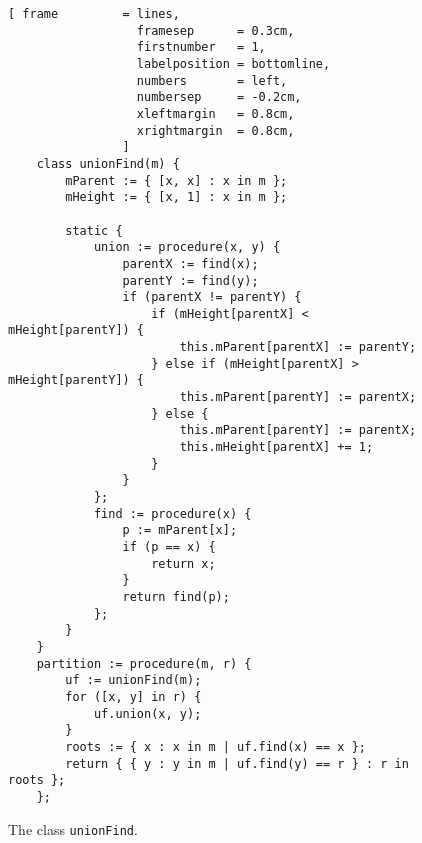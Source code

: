 \begin{figure}[!ht]
\centering
\begin{Verbatim}[ frame         = lines, 
                  framesep      = 0.3cm, 
                  firstnumber   = 1,
                  labelposition = bottomline,
                  numbers       = left,
                  numbersep     = -0.2cm,
                  xleftmargin   = 0.8cm,
                  xrightmargin  = 0.8cm,
                ]
    class unionFind(m) {
        mParent := { [x, x] : x in m };
        mHeight := { [x, 1] : x in m };
        
        static {
            union := procedure(x, y) {
                parentX := find(x);
                parentY := find(y);
                if (parentX != parentY) {
                    if (mHeight[parentX] < mHeight[parentY]) {
                        this.mParent[parentX] := parentY;  
                    } else if (mHeight[parentX] > mHeight[parentY]) {
                        this.mParent[parentY] := parentX;  
                    } else {
                        this.mParent[parentY] := parentX;  
                        this.mHeight[parentX] += 1;
                    }
                }
            };
            find := procedure(x) {
                p := mParent[x]; 
                if (p == x) {
                    return x;
                }
                return find(p);
            };
        }
    }
    partition := procedure(m, r) {
        uf := unionFind(m);
        for ([x, y] in r) {
            uf.union(x, y);
        }
        roots := { x : x in m | uf.find(x) == x };
        return { { y : y in m | uf.find(y) == r } : r in roots };
    };
\end{Verbatim}
\vspace*{-0.3cm}
\caption{The class \texttt{unionFind}.}
\label{fig:union-find-oo.stlx}
\end{figure}

